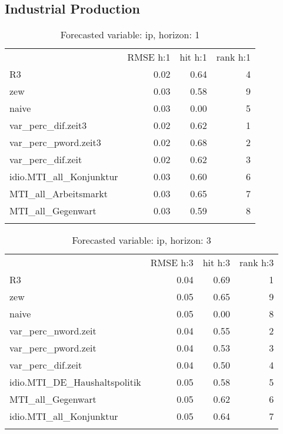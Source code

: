 \documentclass[11pt,]{article}
\title{}
\author{}
\date{}
\begin{document}
\maketitle


\subsection{Industrial Production}\label{industrial-production}

\begin{longtable}[c]{@{}lrrr@{}}
\toprule\addlinespace
& RMSE h:1 & hit h:1 & rank h:1
\\\addlinespace
\midrule\endhead
R3 & 0.02 & 0.64 & 4
\\\addlinespace
zew & 0.03 & 0.58 & 9
\\\addlinespace
naive & 0.03 & 0.00 & 5
\\\addlinespace
var\_perc\_dif.zeit3 & 0.02 & 0.62 & 1
\\\addlinespace
var\_perc\_pword.zeit3 & 0.02 & 0.68 & 2
\\\addlinespace
var\_perc\_dif.zeit & 0.02 & 0.62 & 3
\\\addlinespace
idio.MTI\_all\_Konjunktur & 0.03 & 0.60 & 6
\\\addlinespace
MTI\_all\_Arbeitsmarkt & 0.03 & 0.65 & 7
\\\addlinespace
MTI\_all\_Gegenwart & 0.03 & 0.59 & 8
\\\addlinespace
\bottomrule
\addlinespace
\caption{Forecasted variable: ip, horizon: 1}
\end{longtable}

\begin{longtable}[c]{@{}lrrr@{}}
\toprule\addlinespace
& RMSE h:3 & hit h:3 & rank h:3
\\\addlinespace
\midrule\endhead
R3 & 0.04 & 0.69 & 1
\\\addlinespace
zew & 0.05 & 0.65 & 9
\\\addlinespace
naive & 0.05 & 0.00 & 8
\\\addlinespace
var\_perc\_nword.zeit & 0.04 & 0.55 & 2
\\\addlinespace
var\_perc\_pword.zeit & 0.04 & 0.53 & 3
\\\addlinespace
var\_perc\_dif.zeit & 0.04 & 0.50 & 4
\\\addlinespace
idio.MTI\_DE\_Haushaltspolitik & 0.05 & 0.58 & 5
\\\addlinespace
MTI\_all\_Gegenwart & 0.05 & 0.62 & 6
\\\addlinespace
idio.MTI\_all\_Konjunktur & 0.05 & 0.64 & 7
\\\addlinespace
\bottomrule
\addlinespace
\caption{Forecasted variable: ip, horizon: 3}
\end{longtable}
\end{document}
